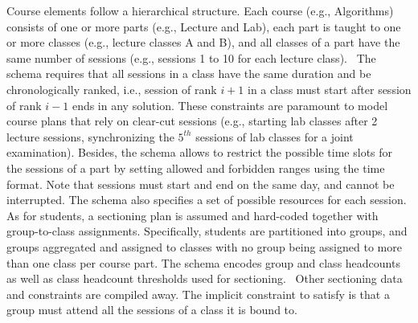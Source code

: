 Course elements follow a hierarchical structure.
Each course (e.g., Algorithms) consists of one or more parts (e.g., Lecture and Lab),
each part is taught to one or more classes (e.g., lecture classes A and B),
and all classes of a part have the same number of sessions (e.g., sessions 1 to 10 for each lecture class).
~The schema requires that all sessions in a class have the same duration
and be chronologically ranked,
i.e., session of rank $i+1$ in a class must start after session of rank $i-1$ ends in any solution.
These constraints are paramount to model course plans that rely on clear-cut sessions
(e.g., starting lab classes after 2 lecture sessions,
synchronizing the $5^{th}$ sessions of lab classes for a joint examination).
Besides, the schema allows to restrict the possible time slots for the sessions of a part
by setting allowed and forbidden ranges using the time format.
Note that 
sessions must start and end on the same day, and cannot be interrupted. %
%
The schema also specifies a set of possible resources for each session.
As for students, %
a sectioning plan
is assumed and hard-coded together with group-to-class assignments.
Specifically, 
students are partitioned into groups,
and groups aggregated and assigned to classes
with no group being assigned to more than one class per course part.
The schema encodes group and class headcounts
as well as class headcount thresholds used for sectioning.%
~Other sectioning data and constraints %
are compiled away.
The implicit constraint to satisfy %
is that a group must attend all the sessions of a class it is bound to.

